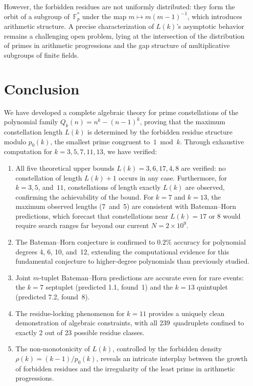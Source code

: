 \documentclass[11pt,a4paper]{article}
\newcommand{\Qk}{Q_k}
\newcommand{\Fpstar}{\mathbb{F}_p^*}
\begin{document}
However, the forbidden residues are not uniformly distributed: they form the orbit of a subgroup of~$\Fpstar$ under the map $m \mapsto m(m-1)^{-1}$, which introduces arithmetic structure. A precise characterization of $L(k)$'s asymptotic behavior remains a challenging open problem, lying at the intersection of the distribution of primes in arithmetic progressions and the gap structure of multiplicative subgroups of finite fields.

\section{Conclusion}

We have developed a complete algebraic theory for prime constellations of the polynomial family $\Qk(n) = n^k - (n-1)^k$, proving that the maximum constellation length $L(k)$ is determined by the forbidden residue structure modulo $p_0(k)$, the smallest prime congruent to~$1 \bmod k$. Through exhaustive computation for $k = 3, 5, 7, 11, 13$, we have verified:

\begin{enumerate}[label=(\roman*)]
\item All five theoretical upper bounds $L(k) = 3, 6, 17, 4, 8$ are verified: no constellation of length $L(k)+1$ occurs in any case. Furthermore, for $k = 3, 5$, and~$11$, constellations of length exactly $L(k)$ are observed, confirming the achievability of the bound. For $k = 7$ and $k = 13$, the maximum observed lengths (7~and~5) are consistent with Bateman--Horn predictions, which forecast that constellations near $L(k) = 17$ or $8$ would require search ranges far beyond our current $N = 2 \times 10^9$.

\item The Bateman--Horn conjecture is confirmed to $0.2\%$ accuracy for polynomial degrees 4, 6, 10, and~12, extending the computational evidence for this fundamental conjecture to higher-degree polynomials than previously studied.

\item Joint $m$-tuplet Bateman--Horn predictions are accurate even for rare events: the $k = 7$ septuplet (predicted 1.1, found~1) and the $k = 13$ quintuplet (predicted 7.2, found~8).

\item The residue-locking phenomenon for $k = 11$ provides a uniquely clean demonstration of algebraic constraints, with all 239~quadruplets confined to exactly 2 out of 23 possible residue classes.

\item The non-monotonicity of $L(k)$, controlled by the forbidden density $\rho(k) = (k-1)/p_0(k)$, reveals an intricate interplay between the growth of forbidden residues and the irregularity of the least prime in arithmetic progressions.
\end{enumerate}
\end{document}

